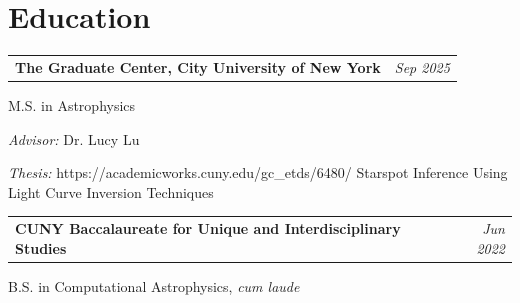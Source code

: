 \section{Education}

\begin{tabularx}{\linewidth}{@{}Xr@{}}
\textbf{The Graduate Center, City University of New York} &
\emph{Sep 2025}
\end{tabularx}

\vspace{-0.25em}

M.S. in Astrophysics

\vspace{-0.15em}

\textit{Advisor:} Dr. Lucy Lu

\vspace{-0.15em}

\textit{Thesis:}
\cvlink
  {https://academicworks.cuny.edu/gc_etds/6480/}
  {Starspot Inference Using Light Curve Inversion Techniques}

\vspace{0.5em}

\begin{tabularx}{\linewidth}{@{}Xr@{}}
\textbf{CUNY Baccalaureate for Unique and Interdisciplinary Studies} &
\emph{Jun 2022}
\end{tabularx}

\vspace{-0.25em}

B.S. in Computational Astrophysics, \emph{cum laude}